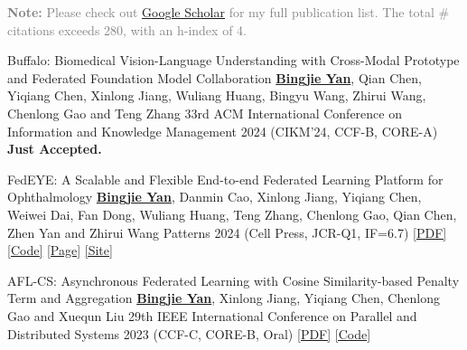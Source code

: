

\begin{cvparagraph}
\textcolor{gray}{\textbf{Note:} Please check out \href{https://scholar.google.com/citations?hl=en&user=DVsgN1sAAAAJ}{Google Scholar} for my full publication list.
The total \# citations exceeds 280, with an h-index of 4.}
\end{cvparagraph}
\vspace{-1.0mm}
\begin{cvpublications}




\cvpublication
{Buffalo: Biomedical Vision-Language Understanding with Cross-Modal Prototype and Federated Foundation Model Collaboration} %
{\underline{\textbf{Bingjie Yan}}, Qian Chen, Yiqiang Chen\dag, Xinlong Jiang\dag, Wuliang Huang, Bingyu Wang, Zhirui Wang, Chenlong Gao and Teng Zhang} %
{33rd ACM International Conference on Information and Knowledge Management} %
{2024} %
{(CIKM'24, CCF-B, CORE-A)}
{\textbf{Just Accepted.}} %

\cvpublication
{FedEYE: A Scalable and Flexible End-to-end Federated Learning Platform for Ophthalmology} %
{\underline{\textbf{Bingjie Yan}}, Danmin Cao, Xinlong Jiang, Yiqiang Chen\dag, Weiwei Dai\dag, Fan Dong, Wuliang Huang, Teng Zhang, Chenlong Gao, Qian Chen, Zhen Yan and Zhirui Wang} %
{Patterns} %
{2024} %
{(Cell Press, JCR-Q1, IF=6.7)} %
{\href{https://www.cell.com/patterns/fulltext/S2666-3899(24)00019-9}{[PDF]} \href{https://github.com/beiyuouo/FedEYE}{[Code]} \href{https://www.bj-yan.top/FedEYE/}{[Page]} \href{https://fedeye.aierchina.com/}{[Site]}} %


\cvpublication
{AFL-CS: Asynchronous Federated Learning with Cosine Similarity-based Penalty Term and Aggregation} %
{\underline{\textbf{Bingjie Yan}}, Xinlong Jiang\dag, Yiqiang Chen\dag, Chenlong Gao and Xuequn Liu} %
{29th IEEE International Conference on Parallel and Distributed Systems} %
{2023} %
{(CCF-C, CORE-B, \textcolor{awesome}{Oral})} %
{\href{https://ieeexplore.ieee.org/document/10476054}{[PDF]} \href{https://github.com/beiyuouo/AFL-CS-ICPADS}{[Code]}} %


\end{cvpublications}
